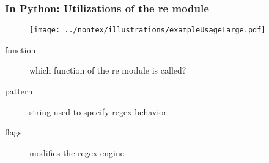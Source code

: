 \begin{frame}
\frametitle{In Python: Utilizations of the re module}
\begin{figure}[h]
  \centering
  \texttt{[image: ../nontex/illustrations/exampleUsageLarge.pdf]}
  \label{fig:exampleUsageLarge}
\end{figure}
\begin{description}
\item [function] which function of the re module is called?
\item [pattern] string used to specify regex behavior
\item [flags] modifies the regex engine
\end{description}
\end{frame}

